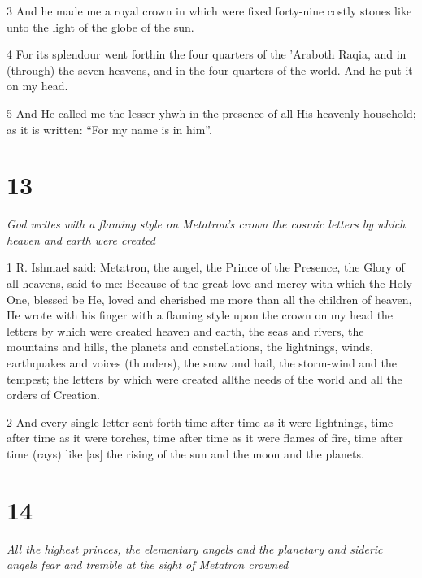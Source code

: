\par 3 And he made me a royal crown in which were fixed forty-nine costly stones like unto the light of the globe of the sun.

\par 4 For its splendour went forthin the four quarters of the 'Araboth Raqia, and in (through) the seven heavens, and in the four quarters of the world. And he put it on my head. 

\par 5 And He called me the lesser yhwh in the presence of all His heavenly household; as it is written: “For my name is in him”. 

\chapter{13}

\par \textit{God writes with a flaming style on Metatron's crown the cosmic letters by which heaven and earth were created}

\par 1 R. Ishmael said: Metatron, the angel, the Prince of the Presence, the Glory of all heavens, said to me: Because of the great love and mercy with which the Holy One, blessed be He, loved and cherished me more than all the children of heaven, He wrote with his finger with a flaming style upon the crown on my head the letters by which were created heaven and earth, the seas and rivers, the mountains and hills, the planets and constellations, the lightnings, winds, earthquakes and voices (thunders), the snow and hail, the storm-wind and the tempest; the letters by which were created allthe needs of the world and all the orders of Creation. 

\par 2 And every single letter sent forth time after time as it were lightnings, time after time as it were torches, time after time as it were flames of fire, time after time (rays) like [as] the rising of the sun and the moon and the planets.

\chapter{14}

\par \textit{All the highest princes, the elementary angels and the planetary and sideric angels fear and tremble at the sight of Metatron crowned}

